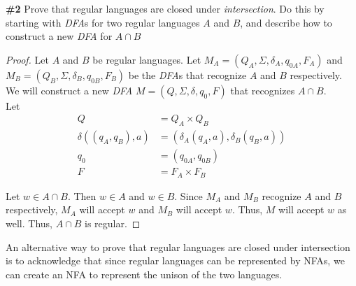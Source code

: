 \documentclass{article}
\newcommand{\problem}[1]{\textbf{\##1}}
\begin{document}
\begin{itemize}
    \begin{center}
        \end{center}
\end{itemize}

\pagebreak

\problem{2} Prove that regular languages are closed under \emph{intersection}. Do this by starting with \emph{DFA}s for two regular languages $A$ and $B$, and describe how to construct a new \emph{DFA} for $A \cap B$

\begin{proof}
    Let $A$ and $B$ be regular languages. Let $M_A = (Q_A, \Sigma, \delta_A, q_{0A}, F_A)$ and $M_B = (Q_B, \Sigma, \delta_B, q_{0B}, F_B)$ be the \emph{DFA}s that recognize $A$ and $B$ respectively. We will construct a new \emph{DFA} $M = (Q, \Sigma, \delta, q_0, F)$ that recognizes $A \cap B$.\\

    Let
    \begin{align*}
        Q &= Q_A \times Q_B\\
        \delta((q_A, q_B), a) &= (\delta_A(q_A, a), \delta_B(q_B, a))\\
        q_0 &= (q_{0A}, q_{0B})\\
        F &= F_A \times F_B
    \end{align*}
    
    Let $w \in A \cap B$. Then $w \in A$ and $w \in B$. Since $M_A$ and $M_B$ recognize $A$ and $B$ respectively, $M_A$ will accept $w$ and $M_B$ will accept $w$. Thus, $M$ will accept $w$ as well. Thus, $A \cap B$ is regular.
\end{proof}

An alternative way to prove that regular languages are closed under intersection is to acknowledge that since regular languages can be represented by NFAs, we can create an NFA to represent the unison of the two languages.
\end{document}
